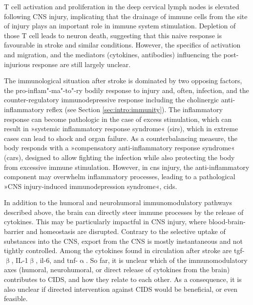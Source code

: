 T cell activation and proliferation in the deep cervical lymph nodes is elevated following CNS injury, implicating that the drainage of immune cells from the site of injury plays an important role in immune system stimulation.\cite{Walsh2015} Depletion of those T cell leads to neuron death, suggesting that this naive response is favourable in stroke and similar conditions. However, the specifics of activation and migration, and the mediators (cytokines, antibodies) influencing the post-injurious response are still largely unclear.\cite{Louveau2015}

The immunological situation after stroke is dominated by two opposing factors, the pro-inflam"-ma"-to"-ry bodily response to injury and, often, infection, and the counter-regulatory immunodepressive response including the cholinergic anti-inflammatory reflex (see Section \ref{sec:intro:immunity}). The inflammatory response can become pathologic in the case of excess stimulation, which can result in »systemic inflammatory response syndrome« (\acs{sirs}), which in extreme cases can lead to shock and organ failure. As a counterbalancing measure, the body responds with a »compensatory anti-inflammatory response syndrome« (\acs{cars}), designed to allow fighting the infection while also protecting the body from excessive immune stimulation. However, in \ac{cns} injury, the anti-inflammatory component may overwhelm inflammatory processes, leading to a pathological »CNS injury-induced immunodepression syndrome«, \acs{cids}.

In addition to the humoral and neurohumoral immunomodulatory pathways described above, the brain can directly steer immune processes by the release of cytokines. This may be particularly impactful in CNS injury, where blood-brain-barrier and homeostasis are disrupted. Contrary to the selective uptake of substances into the CNS, export from the CNS is mostly instantaneous and not tightly controlled. Among the cytokines found in circulation after stroke are \ac{tgf}-$\upbeta$, IL-1$\upbeta$, \ac{il}-6, and \ac{tnf}-$\upalpha$. So far, it is unclear which of the immunomodulatory axes (humoral, neurohumoral, or direct release of cytokines from the brain) contributes to CIDS, and how they relate to each other. As a consequence, it is also unclear if directed intervention against CIDS would be beneficial, or even feasible.\cite{Meisel2005}

